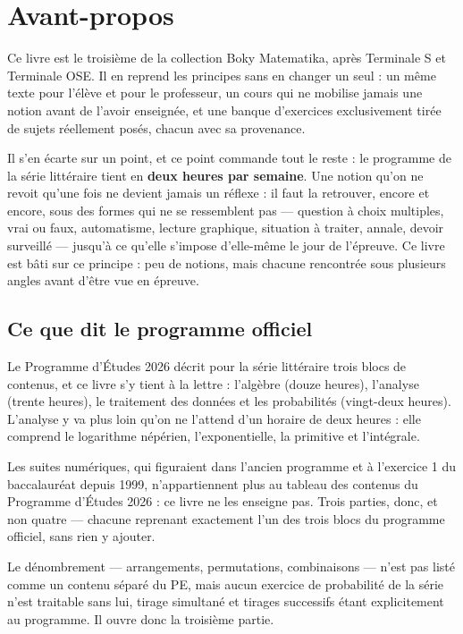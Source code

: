 \chapter*{Avant-propos}

Ce livre est le troisième de la collection Boky Matematika, après Terminale S
et Terminale OSE. Il en reprend les principes sans en changer un seul : un
même texte pour l'élève et pour le professeur, un cours qui ne mobilise
jamais une notion avant de l'avoir enseignée, et une banque d'exercices
exclusivement tirée de sujets réellement posés, chacun avec sa provenance.

Il s'en écarte sur un point, et ce point commande tout le reste : le
programme de la série littéraire tient en \textbf{deux heures par semaine}.
Une notion qu'on ne revoit qu'une fois ne devient jamais un réflexe : il
faut la retrouver, encore et encore, sous des formes qui ne se ressemblent
pas — question à choix multiples, vrai ou faux, automatisme, lecture
graphique, situation à traiter, annale, devoir surveillé — jusqu'à ce
qu'elle s'impose d'elle-même le jour de l'épreuve. Ce livre est bâti sur ce
principe : peu de notions, mais chacune rencontrée sous plusieurs angles
avant d'être vue en épreuve.

\section*{Ce que dit le programme officiel}

Le Programme d'Études 2026 décrit pour la série littéraire trois blocs de
contenus, et ce livre s'y tient à la lettre : l'algèbre (douze heures),
l'analyse (trente heures), le traitement des données et les probabilités
(vingt-deux heures). L'analyse y va plus loin qu'on ne l'attend d'un horaire
de deux heures : elle comprend le logarithme népérien, l'exponentielle, la
primitive et l'intégrale.

Les suites numériques, qui figuraient dans l'ancien programme et à
l'exercice 1 du baccalauréat depuis 1999, n'appartiennent plus au tableau
des contenus du Programme d'Études 2026 : ce livre ne les enseigne pas. Trois
parties, donc, et non quatre — chacune reprenant exactement l'un des trois
blocs du programme officiel, sans rien y ajouter.

Le dénombrement — arrangements, permutations, combinaisons — n'est pas listé
comme un contenu séparé du PE, mais aucun exercice de probabilité de la série
n'est traitable sans lui, tirage simultané et tirages successifs étant
explicitement au programme. Il ouvre donc la troisième partie.

